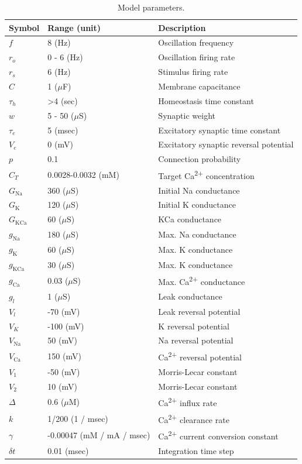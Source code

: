 \documentclass{article}
\begin{document}
\newpage
\begin{table}
\centering
\begin{tabular}{@{}lll@{}}
\toprule
\textbf{Symbol} & \textbf{Range (unit)} & \textbf{Description} \\ \midrule
$f$ & 8 (Hz) & Oscillation frequency \\
$r_o$ & 0 - 6 (Hz) & Oscillation firing rate \\
$r_s$ & 6 (Hz) & Stimulus firing rate \\
$C$ & 1 ($\mu$F) & Membrane capacitance \\
$\tau_h$ & \textgreater 4 (sec) & Homeostasis time constant \\
$w$ & 5 - 50 ($\mu$S) & Synaptic weight \\
$\tau_e$ & 5 (msec) & Excitatory synaptic time constant \\
$V_e$ & 0 (mV) & Excitatory synaptic reversal potential \\
$p$ & 0.1 & Connection probability \\
$C_T$ & 0.0028-0.0032 (mM) & Target Ca\textsuperscript{2+} concentration \\
$G_\text{Na}$ & 360 ($\mu$S) & Initial Na conductance \\
$G_\text{K}$ & 120 ($\mu$S) & Initial K conductance \\
$G_\text{KCa}$ & 60 ($\mu$S) & KCa conductance \\
$g_\text{Na}$ & 180 ($\mu$S) & Max. Na conductance \\
$g_\text{K}$ & 60 ($\mu$S) & Max. K conductance \\
$g_\text{KCa}$ & 30 ($\mu$S) & Max. K conductance \\
$g_\text{Ca}$ & 0.03 ($\mu$S) & Max. Ca\textsuperscript{2+} conductance \\
$g_l$ & 1 ($\mu$S) & Leak conductance \\
$V_l$ & -70 (mV) & Leak reversal potential \\
$V_K$ & -100 (mV) & K reversal potential \\
$V_\text{Na}$ & 50 (mV) & Na reversal potential \\
$V_\text{Ca}$ & 150 (mV) & Ca\textsuperscript{2+} reversal potential \\
$V_\text{1}$ & -50 (mV) & Morris-Lecar constant \\
$V_\text{2}$ & 10 (mV) & Morris-Lecar constant \\
$\Delta$ & 0.6 ($\mu$M) & Ca\textsuperscript{2+} influx rate \\
$k$ & 1/200 (1 / msec) & Ca\textsuperscript{2+} clearance rate \\
$\gamma$ & -0.00047 (mM / mA / msec) & Ca\textsuperscript{2+} current conversion constant \\
$\delta t$ & 0.01 (msec) & Integration time step \\ \bottomrule
\end{tabular}
\caption{Model parameters.}
\label{table:params}
\end{table}

\newpage


\end{document}
